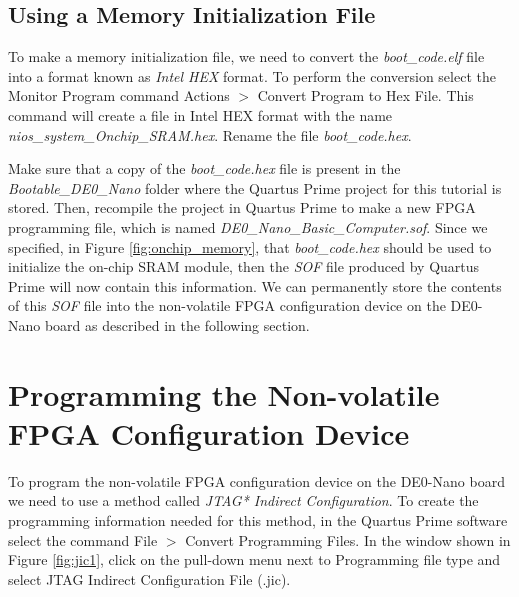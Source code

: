 \documentclass[11pt, twoside, pdftex]{article}
\begin{document}
\subsection{Using a Memory Initialization File}

To make a memory initialization file, we need to convert the {\it boot\_code.elf} file
into a format known as {\it Intel HEX} format. To perform the conversion select the
Monitor Program command {\sf Actions} $>$ {\sf Convert Program to Hex File}. This command
will create a file in Intel HEX format with the name {\it nios\_system\_Onchip\_SRAM.hex}.
Rename the file {\it boot\_code.hex}.

Make sure that a copy of the {\it boot\_code.hex} file is present in the 
{\it Bootable\_DE0\_Nano} folder where the Quartus Prime project for this tutorial is stored.
Then, recompile the project in Quartus Prime to make a new FPGA programming file, which is named 
{\it DE0\_Nano\_Basic\_Computer.sof}.  Since we specified, in Figure \ref{fig:onchip_memory},
that {\it boot\_code.hex} should be used to initialize the on-chip SRAM module, then 
the {\it SOF} file produced by Quartus Prime will now contain this information. We can
permanently store the contents of this {\it SOF} file into the non-volatile
FPGA configuration device on the DE0-Nano board as described in the following section.

\section{Programming the Non-volatile FPGA Configuration Device}

To program the non-volatile FPGA configuration device on the DE0-Nano board we need to use
a method called {\it JTAG* Indirect Configuration}. To create the programming information
needed for this method, in the Quartus Prime software select the command {\sf File} $>$
{\sf Convert Programming Files}. In the window shown in Figure \ref{fig:jic1}, click 
on the pull-down menu next to {\sf Programming file type} and select {\sf JTAG Indirect Configuration File (.jic)}.
\end{document}
